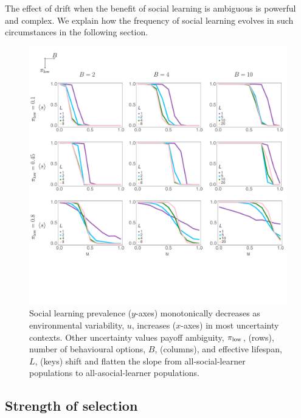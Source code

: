 \documentclass[letterpaper,11.5pt]{scrartcl}
\newcommand{\cm}[1]{{\textcolor{mypurple} {({\tiny CM:} #1)}}}
\begin{document}
The effect of drift when the benefit of social learning is ambiguous is powerful and complex. We explain how the frequency of social learning evolves in such circumstances in the following section.



\begin{figure}
  \caption{Social learning prevalence ($y$-axes) monotonically decreases as 
  environmental variability, $u$, increases ($x$-axes) in most uncertainty contexts. 
  Other uncertainty values payoff ambiguity, $\pi_{\mathrm{low}}$, (rows), number of behavioural options, $B$, (columns), and effective lifespan, $L$, (keys) shift and flatten the slope from all-social-learner populations to all-asocial-learner
  populations.}
  \label{fig:mainResults}
  \centering
    \includegraphics[width=\textwidth]{Figures/mainResultsPlots.pdf}
\end{figure}

\subsection{Strength of selection}
\end{document}
